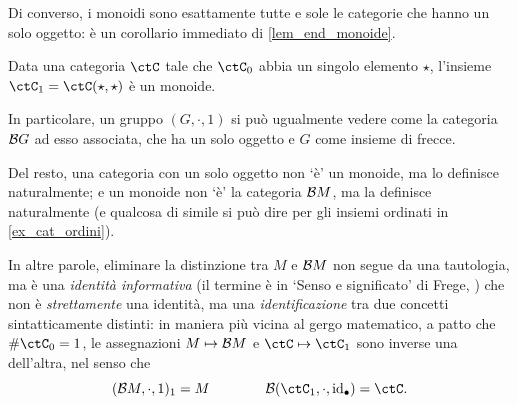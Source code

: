 Di converso, i monoidi sono esattamente tutte e sole le categorie che hanno un solo oggetto: è un corollario immediato di \ref{lem_end_monoide}.
\begin{theorem}\label{cat_sonomon}
 Data una categoria \(\ctC\) tale che \(\ctC_0\) abbia un singolo elemento \(\star\), l'insieme \(\ctC_1 = \Hom{\ctC}(\star,\star)\) è un monoide.
\end{theorem}
\begin{corollary}\label{cor_cat_mon}
 In particolare, un gruppo \((G,\cdot,1)\) si può ugualmente vedere come la categoria \(\mathcal{B} G\) ad esso associata, che ha un solo oggetto e \(G\) come insieme di frecce.
\end{corollary}
\begin{remark}
 Del resto, una categoria con un solo oggetto non `è' un monoide, ma lo definisce naturalmente; e un monoide non `è' la categoria \(\mathcal{B} M\), ma la definisce naturalmente (e qualcosa di simile si può dire per gli insiemi ordinati in \ref{ex_cat_ordini}).

 In altre parole, eliminare la distinzione tra \(M\) e \(\mathcal{B} M\) non segue da una tautologia, ma è una \emph{identità informativa} (il termine è in `Senso e significato' di Frege, \cite{frege1892sinn}) che non è \emph{strettamente} una identità, ma una \emph{identificazione} tra due concetti sintatticamente distinti: in maniera più vicina al gergo matematico, a patto che \(\#\ctC_0 = 1\), le assegnazioni \(M\mapsto \mathcal{B} M\) e \(\ctC\mapsto \ctC_1\) sono inverse una dell'altra, nel senso che
 \[(\susp M,\cdot,1)_1 = M\qquad\qquad\susp(\ctC_1,\cmp,\id_\bullet) = \ctC.\]
\end{remark}
